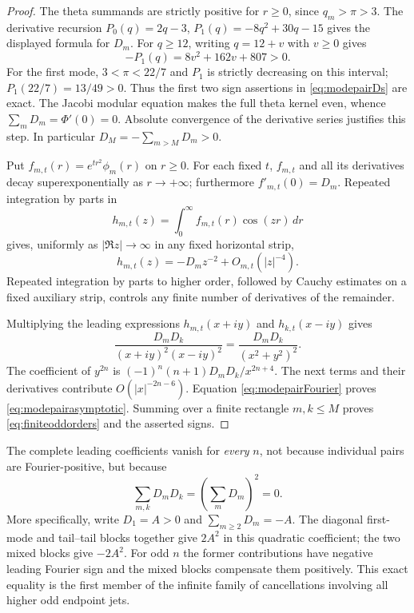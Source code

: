 \begin{proof}
The theta summands are strictly positive for
\(r\ge0\), since \(q_m>\pi>3\).
The derivative recursion
\(P_0(q)=2q-3\),
\(P_1(q)=-8q^2+30q-15\) gives the displayed
formula for \(D_m\).
For \(q\ge12\), writing \(q=12+v\) with \(v\ge0\)
gives
\[
-P_1(q)=8v^2+162v+807>0.
\]
For the first mode, \(3<\pi<22/7\) and
\(P_1\) is strictly decreasing on this interval;
\(P_1(22/7)=13/49>0\). Thus the first two
sign assertions in \eqref{eq:modepairDs} are exact.
The Jacobi modular equation makes the full
theta kernel even, whence
\(\sum_mD_m=\Phi'(0)=0\). Absolute convergence of
the derivative series justifies this step.
In particular \(D_M=-\sum_{m>M}D_m>0\).

Put \(f_{m,t}(r)=e^{tr^2}\phi_m(r)\) on \(r\ge0\).
For each fixed \(t\), \(f_{m,t}\) and all its
derivatives decay superexponentially as
\(r\to+\infty\); furthermore
\(f'_{m,t}(0)=D_m\).
Repeated integration by parts in
\[
h_{m,t}(z)=\int_0^\infty
f_{m,t}(r)\cos(zr)\,dr
\]
gives, uniformly as \(|\Re z|\to\infty\) in
any fixed horizontal strip,
\begin{equation}
h_{m,t}(z)=-D_mz^{-2}+O_{m,t}(|z|^{-4}).
\label{eq:modepairhalfline}
\end{equation}
Repeated integration by parts to higher
order, followed by Cauchy estimates on a
fixed auxiliary strip, controls any finite
number of derivatives of the remainder.

Multiplying the leading expressions
\(h_{m,t}(x+iy)\) and \(h_{k,t}(x-iy)\)
gives
\[
\frac{D_mD_k}{(x+iy)^2(x-iy)^2}
=\frac{D_mD_k}{(x^2+y^2)^2}.
\]
The coefficient of \(y^{2n}\) is
\((-1)^n(n+1)D_mD_k/x^{2n+4}\).
The next terms and their derivatives
contribute \(O(|x|^{-2n-6})\).
Equation \eqref{eq:modepairFourier} proves
\eqref{eq:modepairasymptotic}. Summing over
a finite rectangle \(m,k\le M\) proves
\eqref{eq:finiteoddorders} and the asserted
signs.
\end{proof}

The complete leading coefficients vanish for
\emph{every} \(n\), not because individual
pairs are Fourier-positive, but because
\[
\sum_{m,k}D_mD_k
=\left(\sum_mD_m\right)^2=0.
\]
More specifically, write
\(D_1=A>0\) and
\(\sum_{m\ge2}D_m=-A\). The diagonal
first-mode and tail--tail blocks together
give \(2A^2\) in this quadratic coefficient;
the two mixed blocks give \(-2A^2\).
For odd \(n\) the former contributions
have negative leading Fourier sign and the
mixed blocks compensate them positively.
This exact equality is the first member of
the infinite family of cancellations involving
all higher odd endpoint jets.

